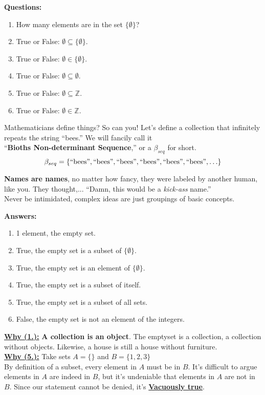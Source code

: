 \noindent
\textbf{Questions:}
\begin{enumerate}
    \item How many elements are in the set  $\{\emptyset\}$?
    \item True or False: $\emptyset \subseteq \{\emptyset\}$.
    \item True or False: $\emptyset \in \{\emptyset\}$.
    \item True or False: $\emptyset \subseteq \emptyset$.
    \item True or False: $\emptyset \subseteq \mathbb{Z}$.
    \item True or False: $\emptyset \in \mathbb{Z}$.
\end{enumerate}
\begin{Tip}
    Mathematicians define things? So can you! Let's define a collection that
    infinitely repeats the string ``bees.'' We will fancily call it\\
    ``\textbf{Bioths Non-determinant Sequence},'' or a $\beta_{seq}$ for short.
    $$\beta_{seq} = \{\textnormal{``bees''}, \textnormal{``bees''}, \textnormal{``bees''}, \textnormal{``bees''},
        \textnormal{``bees''}, \textnormal{``bees''}, \ldots\}$$

    \noindent
    \textbf{Names are names}, no matter how fancy, they were labeled
    by another human, like you. They thought,... ``Damn, this would be a \textit{kick-ass} name.''\\
    Never be intimidated, complex ideas are just groupings of basic concepts.
\end{Tip}
\newpage
\noindent
\textbf{Answers:}
\begin{enumerate}
    \item 1 element, the empty set.
    \item True, the empty set is a subset of $\{\emptyset\}$.
    \item True, the empty set is an element of $\{\emptyset\}$.
    \item True, the empty set is a subset of itself.
    \item True, the empty set is a subset of all sets.
    \item False, the empty set is not an element of the integers.
\end{enumerate}

\vspace{2em}

\noindent
\begin{greenbox}
    \underline{\textbf{Why (1.):}} \textbf{A collection is an object}. The emptyset is a collection,
    a collection without objects. Likewise, a house is still a house without furniture.\\

    \noindent
    \underline{\textbf{Why (5.):}} Take sets $A=\{\}$ and $B=\{1,2,3\}$\\
    By definition of a subset, every element in $A$ must be in $B$. It's difficult to
    argue elements in $A$ are indeed in $B$, but it's undeniable that elements in $A$ are not in $B$.
    Since our statement cannot be denied, it's \underline{\textbf{Vacuously true}}.\\
\end{greenbox}


